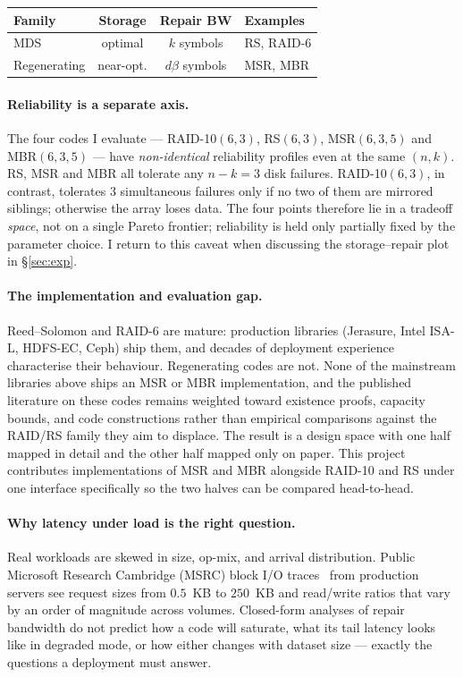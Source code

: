 \documentclass[letterpaper,twocolumn,10pt]{article}
\begin{document}
\begin{center}
\small
\begin{tabular}{@{}lccl@{}}
\toprule
Family & Storage & Repair BW & Examples \\
\midrule
MDS & optimal & $k$ symbols & RS, RAID-6 \\
Regenerating & near-opt. & $d\beta$ symbols & MSR, MBR \\
\bottomrule
\end{tabular}
\end{center}

\paragraph{Reliability is a separate axis.}
The four codes I evaluate --- RAID-10$(6,3)$, RS$(6,3)$, MSR$(6,3,5)$ and
MBR$(6,3,5)$ --- have \emph{non-identical} reliability profiles even at the
same $(n,k)$. RS, MSR and MBR all tolerate any $n-k=3$ disk failures.
RAID-10$(6,3)$, in contrast, tolerates 3 simultaneous failures only if no
two of them are mirrored siblings; otherwise the array loses data. The four
points therefore lie in a tradeoff \emph{space}, not on a single Pareto
frontier; reliability is held only partially fixed by the parameter choice.
I return to this caveat when discussing the storage--repair plot in
\S\ref{sec:exp}.

\paragraph{The implementation and evaluation gap.}
Reed--Solomon and RAID-6 are mature: production libraries (Jerasure,
Intel ISA-L, HDFS-EC, Ceph) ship them, and decades of deployment
experience characterise their behaviour. Regenerating codes are not.
None of the mainstream libraries above ships an MSR or MBR
implementation, and the published literature on these codes
remains weighted toward existence proofs, capacity bounds, and code
constructions rather than empirical comparisons against the RAID/RS
family they aim to displace. The result is a design space with one
half mapped in detail and the other half mapped only on paper. This
project contributes implementations of MSR and MBR alongside RAID-10
and RS under one interface specifically so the two halves can be
compared head-to-head.

\paragraph{Why latency under load is the right question.}
Real workloads are skewed in size, op-mix, and arrival distribution. Public
Microsoft Research Cambridge (MSRC) block I/O
traces~\cite{narayanan08} from production servers see request sizes from
$0.5$~KB to $250$~KB and read/write ratios that vary by an order of
magnitude across volumes. Closed-form analyses of repair bandwidth do not
predict how a code will saturate, what its tail latency looks like in
degraded mode, or how either changes with dataset size --- exactly the
questions a deployment must answer.
\end{document}

